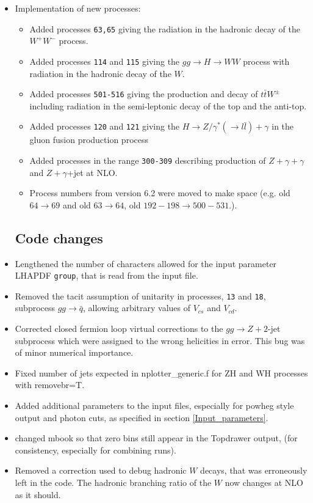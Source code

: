 \documentclass{article}
\begin{document}
{{{{{{\begin{itemize}
\item Implementation of new processes:
\begin{itemize}
\item
Added processes {\tt 63,65} giving the radiation in the hadronic decay of the $W^+W^-$ process. 
\item 
Added processes {\tt 114} and {\tt 115} giving the $gg\to H\to WW$ process with radiation in the hadronic decay of the $W$.
\item 
Added processes {\tt 501-516} giving the production and decay of 
$t \bar{t} W^\pm$ including radiation in the semi-leptonic decay of the top and the anti-top.
\item 
Added processes {\tt 120} and {\tt 121} giving the $H\to Z/\gamma^*(\to l \bar{l})+\gamma$ 
in the gluon fusion production process
\item 
Added processes in the range {\tt 300-309} describing production of $Z+\gamma+\gamma$ 
and $Z+\gamma$+jet at NLO.
\item
Process numbers from version 6.2 were moved to make space 
(e.g. old $64 \to 69$ and old $63\to 64$, old $192-198 \to 500-531$.). 
\end{itemize}
\subsection{Code changes}
\item Lengthened the number of characters allowed for the input parameter LHAPDF {\tt group}, 
that is read from the input file.
\item Removed the tacit assumption of unitarity in processes, {\tt 13} and {\tt 18}, 
subprocess $gg \to \bar{q}$, 
allowing arbitrary values of $V_{cs}$ and $V_{cd}$.  
\item 
Corrected closed fermion loop virtual corrections to the $gg \to Z+2$-jet subprocess which were assigned to the wrong 
helicities in error. This bug was of minor numerical importance. 
\item
Fixed number of jets expected in nplotter\_generic.f for ZH and WH processes with removebr=T.
\item
Added additional parameters to the input files, 
especially for powheg style output and photon cuts, as specified in section \ref{Input_parameters}.
\item 
changed mbook so that zero bins still appear in the Topdrawer output,
(for consistency, especially for combining runs).
\item
Removed a correction used to debug hadronic $W$ decays, that was erroneously left in the code.
The hadronic branching ratio of the $W$ now changes at NLO as it should.


\end{itemize}}}}}}}
\end{document}
